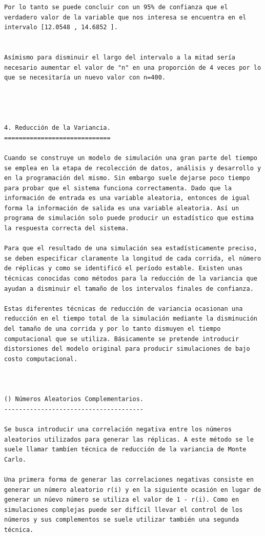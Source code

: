\begin{verbatim}
Por lo tanto se puede concluir con un 95% de confianza que el verdadero valor de la variable que nos interesa se encuentra en el intervalo [12.0548 , 14.6852 ].


Asímismo para disminuir el largo del intervalo a la mitad sería necesario aumentar el valor de "n" en una proporción de 4 veces por lo que se necesitaría un nuevo valor con n=400.




4. Reducción de la Variancia.
=============================

Cuando se construye un modelo de simulación una gran parte del tiempo se emplea en la etapa de recolección de datos, análisis y desarrollo y en la programación del mismo. Sin embargo suele dejarse poco tiempo para probar que el sistema funciona correctamenta. Dado que la información de entrada es una variable aleatoria, entonces de igual forma la información de salida es una variable aleatoria. Así un programa de simulación solo puede producir un estadístico que estima la respuesta correcta del sistema.

Para que el resultado de una simulación sea estadísticamente preciso, se deben especificar claramente la longitud de cada corrida, el número de réplicas y como se identificó el período estable. Existen unas técnicas conocidas como métodos para la reducción de la variancia que ayudan a disminuir el tamaño de los intervalos finales de confianza. 

Estas diferentes técnicas de reducción de variancia ocasionan una reducción en el tiempo total de la simulación mediante la disminución del tamaño de una corrida y por lo tanto dismuyen el tiempo computacional que se utiliza. Básicamente se pretende introducir distorsiones del modelo original para producir simulaciones de bajo costo computacional.



() Números Aleatorios Complementarios.
--------------------------------------

Se busca introducir una correlación negativa entre los números aleatorios utilizados para generar las réplicas. A este método se le suele llamar tambíen técnica de reducción de la variancia de Monte Carlo.

Una primera forma de generar las correlaciones negativas consiste en generar un número aleatorio r(i) y en la siguiente ocasión en lugar de generar un núevo número se utiliza el valor de 1 - r(i). Como en simulaciones complejas puede ser difícil llevar el control de los números y sus complementos se suele utilizar también una segunda técnica.


\end{verbatim}
